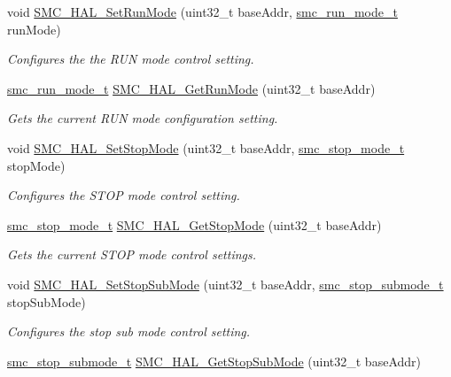 \begin{DoxyCompactItemize}
void \hyperlink{group__smc__hal_gace81b7afd0981dd1e6fe9e1febc54a28}{S\+M\+C\+\_\+\+H\+A\+L\+\_\+\+Set\+Run\+Mode} (uint32\+\_\+t base\+Addr, \hyperlink{group__smc__hal_ga861334db15972df1faebfec3992bf211}{smc\+\_\+run\+\_\+mode\+\_\+t} run\+Mode)
\begin{DoxyCompactList}\small\item\em Configures the the R\+UN mode control setting. \end{DoxyCompactList}\item 
\hyperlink{group__smc__hal_ga861334db15972df1faebfec3992bf211}{smc\+\_\+run\+\_\+mode\+\_\+t} \hyperlink{group__smc__hal_ga4af335cda8439557721d5f3c8d65de0f}{S\+M\+C\+\_\+\+H\+A\+L\+\_\+\+Get\+Run\+Mode} (uint32\+\_\+t base\+Addr)
\begin{DoxyCompactList}\small\item\em Gets the current R\+UN mode configuration setting. \end{DoxyCompactList}\item 
void \hyperlink{group__smc__hal_ga3882b9e8300acfdf835473f35e192ada}{S\+M\+C\+\_\+\+H\+A\+L\+\_\+\+Set\+Stop\+Mode} (uint32\+\_\+t base\+Addr, \hyperlink{group__smc__hal_ga2fdba7a72fb477e8b4515b3a52055291}{smc\+\_\+stop\+\_\+mode\+\_\+t} stop\+Mode)
\begin{DoxyCompactList}\small\item\em Configures the S\+T\+OP mode control setting. \end{DoxyCompactList}\item 
\hyperlink{group__smc__hal_ga2fdba7a72fb477e8b4515b3a52055291}{smc\+\_\+stop\+\_\+mode\+\_\+t} \hyperlink{group__smc__hal_ga36b38c96e06bb17eaa90a70e268b0468}{S\+M\+C\+\_\+\+H\+A\+L\+\_\+\+Get\+Stop\+Mode} (uint32\+\_\+t base\+Addr)
\begin{DoxyCompactList}\small\item\em Gets the current S\+T\+OP mode control settings. \end{DoxyCompactList}\item 
void \hyperlink{group__smc__hal_ga7e3f5fc54f9172862db302330677b832}{S\+M\+C\+\_\+\+H\+A\+L\+\_\+\+Set\+Stop\+Sub\+Mode} (uint32\+\_\+t base\+Addr, \hyperlink{group__smc__hal_ga320ac5c2c75de55f308be3f6735e0268}{smc\+\_\+stop\+\_\+submode\+\_\+t} stop\+Sub\+Mode)
\begin{DoxyCompactList}\small\item\em Configures the stop sub mode control setting. \end{DoxyCompactList}\item 
\hyperlink{group__smc__hal_ga320ac5c2c75de55f308be3f6735e0268}{smc\+\_\+stop\+\_\+submode\+\_\+t} \hyperlink{group__smc__hal_ga75d390db241e69894b5ca1afa7e3f2c9}{S\+M\+C\+\_\+\+H\+A\+L\+\_\+\+Get\+Stop\+Sub\+Mode} (uint32\+\_\+t base\+Addr)

\end{DoxyCompactItemize}
